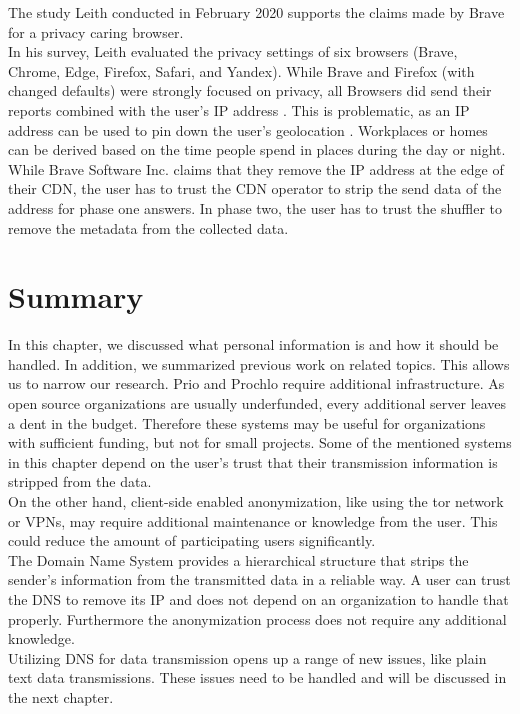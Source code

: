         The study Leith conducted in February 2020  \cite{leith_web_2020} supports the claims made by Brave for a privacy caring browser.\\
        In his survey, Leith evaluated the privacy settings of six browsers (Brave, Chrome, Edge, Firefox, Safari, and Yandex). While Brave and Firefox (with changed defaults) were strongly focused on privacy, all Browsers did send their reports combined with the user's IP address \cite{leith_web_2020}.
        This is problematic, as an IP address can be used to pin down the user's geolocation \cite{koch_geolocation_2013}. Workplaces or homes can be derived based on the time people spend in places during the day or night. 
        While Brave Software Inc. claims that they remove the IP address at the edge of their CDN, the user has to trust the CDN operator to strip the send data of the address for phase one answers. In phase two, the user has to trust the shuffler to remove the metadata from the collected data. 
\newpage

\section{Summary}
    In this chapter, we discussed what personal information is and how it should be handled.
    In addition, we summarized previous work on related topics. This allows us to narrow our research.
    Prio and Prochlo require additional infrastructure. As open source organizations are usually underfunded, every additional server leaves a dent in the budget. Therefore these systems may be
    useful for organizations with sufficient funding, but not for small projects. Some of the mentioned systems in this chapter depend on the user's trust that their transmission information is stripped from the data.\\
    
    On the other hand, client-side enabled anonymization, like using the tor network or VPNs, may require additional maintenance or knowledge from the user. This could reduce the amount of participating users significantly.\\
    
    The Domain Name System provides a hierarchical structure that strips the sender's information from the transmitted data in a reliable way. A user can trust the DNS to remove its IP and does not depend on an organization to handle that properly. Furthermore the anonymization process does not require any additional knowledge.\\
    Utilizing DNS for data transmission opens up a range of new issues, like plain text data transmissions. These issues need to be handled and will be discussed in the next chapter.\\ 

%


  